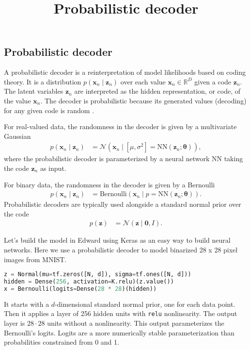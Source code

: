 \title{Probabilistic decoder}

\subsection{Probabilistic decoder}

A probabilistic decoder is a reinterpretation of model likelihoods
based on coding theory. It is a distribution $p(\mathbf{x}_n\mid \mathbf{z}_n)$  over each value
$\mathbf{x}_n\in\mathbb{R}^D$ given a code $\mathbf{z}_n$. The latent
variables $\mathbf{z}_n$ are interpreted as the hidden representation, or code, of the value
$\mathbf{x}_n$. The decoder is probabilistic because its generated
values (decoding) for any given code is random
\citep{dayan1995helmholtz}.

For real-valued data,
the randomness in the decoder is given by a multivariate Gaussian
\begin{align*}
  p(\mathbf{x}_n\mid\mathbf{z}_n)
  &=
  \mathcal{N}(\mathbf{x}_n\mid [\mu,\sigma^2]=\mathrm{NN}(\mathbf{z}_n; \mathbf{\theta})),
\end{align*}
where the probabilistic decoder is parameterized by a neural network
$\mathrm{NN}$ taking the code $\mathbf{z}_n$ as input.

For binary data,
the randomness in the decoder is given by a Bernoulli
\begin{align*}
  p(\mathbf{x}_n\mid\mathbf{z}_n)
  &=
  \text{Bernoulli}(\mathbf{x}_n\mid p=\mathrm{NN}(\mathbf{z}_n; \mathbf{\theta})).
\end{align*}
Probabilistic decoders are typically used alongside a standard normal
prior over the code
\begin{align*}
  p(\mathbf{z})
  &=
  \mathcal{N}(\mathbf{z} \mid \mathbf{0}, I).
\end{align*}

Let's build the model in Edward using
Keras as an easy way to build neural networks. Here we use a
probabilistic decoder to model binarized 28 x 28
pixel images from MNIST.
\begin{lstlisting}[language=Python]
z = Normal(mu=tf.zeros([N, d]), sigma=tf.ones([N, d]))
hidden = Dense(256, activation=K.relu)(z.value())
x = Bernoulli(logits=Dense(28 * 28)(hidden))
\end{lstlisting}
It starts with a $d$-dimensional standard normal prior, one for each
data point. Then it applies a layer of 256 hidden units with
\texttt{relu} nonlinearity. The output layer is $28\cdot 28$ units
without a nonlinearity. This output
parameterizes the Bernoulli's logits. Logits are a more numerically stable
parameterization than probabilities constrained
from 0 and 1.

